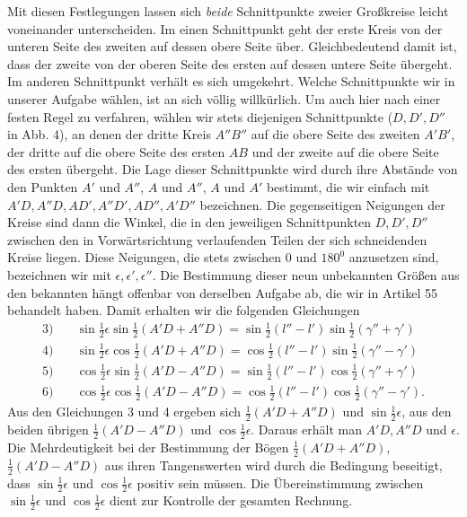 Mit diesen Festlegungen lassen sich \emph{beide} Schnittpunkte zweier Großkreise leicht
voneinander unterscheiden. Im einen Schnittpunkt geht der erste Kreis von der unteren Seite des
zweiten auf dessen obere Seite über. Gleichbedeutend damit ist, dass der zweite von der oberen
Seite des ersten auf dessen untere Seite übergeht. Im anderen Schnittpunkt verhält es sich
umgekehrt. Welche Schnittpunkte wir in unserer Aufgabe wählen, ist an sich völlig willkürlich.
Um auch hier nach einer festen Regel zu verfahren, wählen wir stets diejenigen Schnittpunkte
($D,D',D''$ in Abb. 4), an denen der dritte Kreis $A''B''$ auf die obere Seite des zweiten $A'B'$, der
dritte auf die obere Seite des ersten $AB$ und der zweite auf die obere Seite des ersten
übergeht. Die Lage dieser Schnittpunkte wird durch \hypertarget{native-184}{}ihre Abstände von den Punkten $A'$
und $A''$, $A$ und $A''$, $A$ und $A'$ bestimmt, die wir einfach mit $A'D,A''D,AD',A''D',AD'',A'D''$
bezeichnen. Die gegenseitigen Neigungen der Kreise sind dann die Winkel, die in den jeweiligen
Schnittpunkten $D,D',D''$ zwischen den in Vorwärtsrichtung verlaufenden Teilen der sich schneidenden
Kreise liegen. Diese Neigungen, die stets zwischen $0$ und $180^0$ anzusetzen sind, bezeichnen
wir mit $\epsilon,\epsilon',\epsilon''$. Die Bestimmung dieser neun unbekannten Größen aus den bekannten hängt offenbar
von derselben Aufgabe ab, die wir in Artikel 55 behandelt haben. Damit erhalten wir die
folgenden Gleichungen
\[
\begin{aligned}
3)\quad&\sin\tfrac12\epsilon\sin\tfrac12(A'D+A''D)=\sin\tfrac12(l''-l')\sin\tfrac12(\gamma''+\gamma')\\[.5ex]
4)\quad&\sin\tfrac12\epsilon\cos\tfrac12(A'D+A''D)=\cos\tfrac12(l''-l')\sin\tfrac12(\gamma''-\gamma')\\[.5ex]
5)\quad&\cos\tfrac12\epsilon\sin\tfrac12(A'D-A''D)=\sin\tfrac12(l''-l')\cos\tfrac12(\gamma''+\gamma')\\[.5ex]
6)\quad&\cos\tfrac12\epsilon\cos\tfrac12(A'D-A''D)=\cos\tfrac12(l''-l')\cos\tfrac12(\gamma''-\gamma').
\end{aligned}
\]
Aus den Gleichungen 3 und 4 ergeben sich $\tfrac12(A'D+A''D)$ und $\sin\tfrac12\epsilon$, aus den beiden übrigen $\tfrac12(A'D-A''D)$ und
$\cos\tfrac12\epsilon$. Daraus erhält man $A'D,A''D$ und $\epsilon$. Die Mehrdeutigkeit bei der Bestimmung der Bögen
$\tfrac12(A'D+A''D)$, $\tfrac12(A'D-A''D)$ aus ihren Tangenswerten wird durch die Bedingung beseitigt, dass $\sin\tfrac12\epsilon$ und
$\cos\tfrac12\epsilon$ positiv sein müssen. Die Übereinstimmung zwischen $\sin\tfrac12\epsilon$ und $\cos\tfrac12\epsilon$ dient zur Kontrolle
der gesamten Rechnung.

